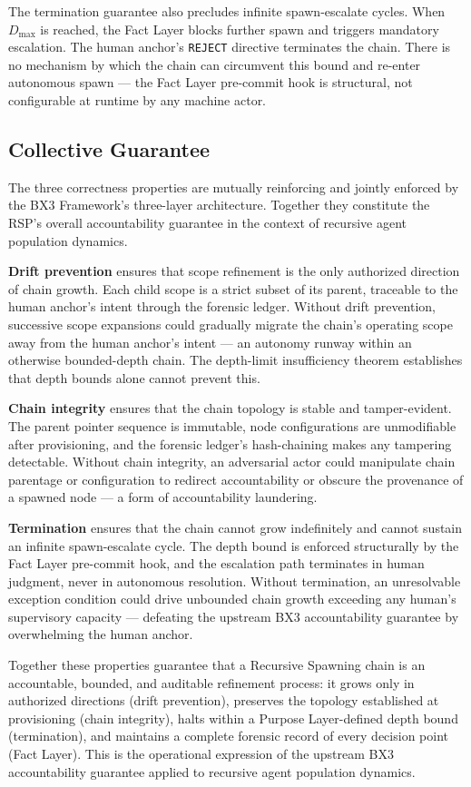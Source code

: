 The termination guarantee also precludes infinite spawn-escalate cycles. When $D_{\mathrm{max}}$ is reached, the Fact Layer blocks further spawn and triggers mandatory escalation. The human anchor's \texttt{REJECT} directive terminates the chain. There is no mechanism by which the chain can circumvent this bound and re-enter autonomous spawn --- the Fact Layer pre-commit hook is structural, not configurable at runtime by any machine actor.

\subsection{Collective Guarantee}
\label{sec:rs-collective-guarantee}

The three correctness properties are mutually reinforcing and jointly enforced by the BX3 Framework's three-layer architecture. Together they constitute the RSP's overall accountability guarantee in the context of recursive agent population dynamics.

\medskip
\textbf{Drift prevention} ensures that scope refinement is the only authorized direction of chain growth. Each child scope is a strict subset of its parent, traceable to the human anchor's intent through the forensic ledger. Without drift prevention, successive scope expansions could gradually migrate the chain's operating scope away from the human anchor's intent --- an autonomy runway within an otherwise bounded-depth chain. The depth-limit insufficiency theorem establishes that depth bounds alone cannot prevent this.

\medskip
\textbf{Chain integrity} ensures that the chain topology is stable and tamper-evident. The parent pointer sequence is immutable, node configurations are unmodifiable after provisioning, and the forensic ledger's hash-chaining makes any tampering detectable. Without chain integrity, an adversarial actor could manipulate chain parentage or configuration to redirect accountability or obscure the provenance of a spawned node --- a form of accountability laundering.

\medskip
\textbf{Termination} ensures that the chain cannot grow indefinitely and cannot sustain an infinite spawn-escalate cycle. The depth bound is enforced structurally by the Fact Layer pre-commit hook, and the escalation path terminates in human judgment, never in autonomous resolution. Without termination, an unresolvable exception condition could drive unbounded chain growth exceeding any human's supervisory capacity --- defeating the upstream BX3 accountability guarantee by overwhelming the human anchor.

\medskip
Together these properties guarantee that a Recursive Spawning chain is an accountable, bounded, and auditable refinement process: it grows only in authorized directions (drift prevention), preserves the topology established at provisioning (chain integrity), halts within a Purpose Layer-defined depth bound (termination), and maintains a complete forensic record of every decision point (Fact Layer). This is the operational expression of the upstream BX3 accountability guarantee applied to recursive agent population dynamics.
